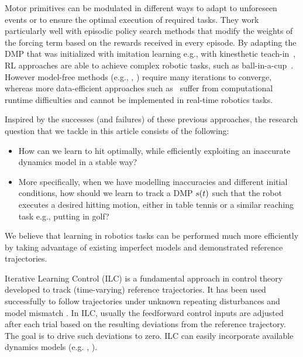 Motor primitives can be modulated in different ways to adapt to unforeseen events or to ensure the optimal execution of required tasks. They work particularly well with episodic policy search methods that modify the weights of the forcing term based on the rewards received in every episode. By adapting the DMP that was initialized with imitation learning e.g., with kinesthetic teach-in~\cite{Muelling13}, RL approaches are able to achieve complex robotic tasks, such as ball-in-a-cup~\cite{Kober08}. However model-free methods (e.g., \cite{Kober08}, \cite{Peter10}) require many iterations to converge, whereas more data-efficient approaches such as~\cite{Deisenroth11} suffer from computational runtime difficulties and cannot be implemented in real-time robotics tasks. %

Inspired by the successes (and failures) of these previous approaches, the research question that we tackle in this article consists of the following:
%
\begin{itemize}
\item How can we learn to hit optimally, while efficiently exploiting an inaccurate dynamics model in a stable way?
%
\item More specifically, when we have modelling inaccuracies and different initial conditions, how should we learn to track a DMP $s(t)$ such that the robot executes a desired hitting motion, either in table tennis or a similar reaching task e.g., putting in golf?

\end{itemize}
%
%
\noindent We believe that learning in robotics tasks can be performed much more efficiently by taking advantage of existing imperfect models and demonstrated reference trajectories. 

Iterative Learning Control (ILC) is a fundamental approach in control theory developed to track (time-varying) reference trajectories. It has been used successfully to follow trajectories under unknown repeating disturbances and model mismatch \cite{Bristow06}. In ILC, usually the feedforward control inputs are adjusted after each trial based on the resulting deviations from the reference trajectory. The goal is to drive such deviations to zero. ILC can easily incorporate available dynamics models (e.g. \cite{Moore07}, \cite{Amann95}).

